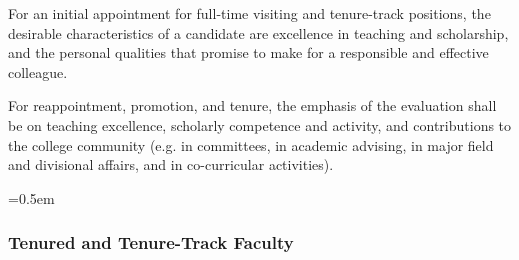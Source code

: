 \documentclass{manual}
\let\oldsubsubsection\subsubsection
\renewcommand\subsubsection{\leftskip=0.5em\oldsubsubsection}
\begin{document}
For an initial appointment for full-time visiting and tenure-track positions, the desirable characteristics of a candidate are excellence in teaching and scholarship, and the personal qualities that promise to make for a responsible and effective colleague.

For reappointment, promotion, and tenure, the emphasis of the evaluation shall be on teaching excellence, scholarly competence and activity, and contributions to the college community (e.g. in committees, in academic advising, in major field and divisional affairs, and in co-curricular activities).

\subsubsection{Tenured and Tenure-Track Faculty}\label{sub:TenuredAndTenureTrackFaculty}

\end{document}
